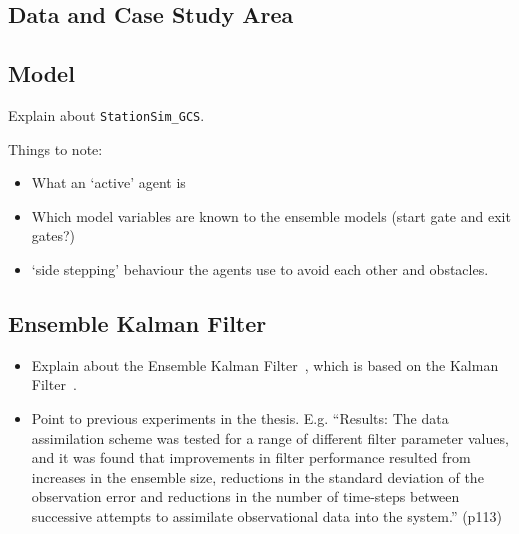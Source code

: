 \documentclass{article}
\begin{document}
\subsection{Data and Case Study Area}




\subsection{Model}\label{sub:methods:model}

Explain about \texttt{StationSim\_GCS}.

Things to note:
\begin{itemize}
  \item What an `active' agent is
  \item Which model variables are known to the ensemble models (start gate and exit gates?)  %
  \item `side stepping' behaviour the agents use to avoid each other and obstacles.
\end{itemize}

% 

\subsection{Ensemble Kalman Filter}\label{sub:methods:enkf}

\begin{itemize}
    \item Explain about the Ensemble Kalman Filter~\citep{evensen_ensemble_2003},
        which is based on the Kalman Filter~\citep{kalman_new_1960}.
    \item Point to previous experiments in the thesis. E.g. ``Results: The data assimilation scheme was tested for a range of different filter
parameter values, and it was found that improvements in filter performance
resulted from increases in the ensemble size, reductions in the standard
deviation of the observation error and reductions in the number of time-steps
between successive attempts to assimilate observational data into the system.'' (p113)
\end{itemize}
\end{document}
